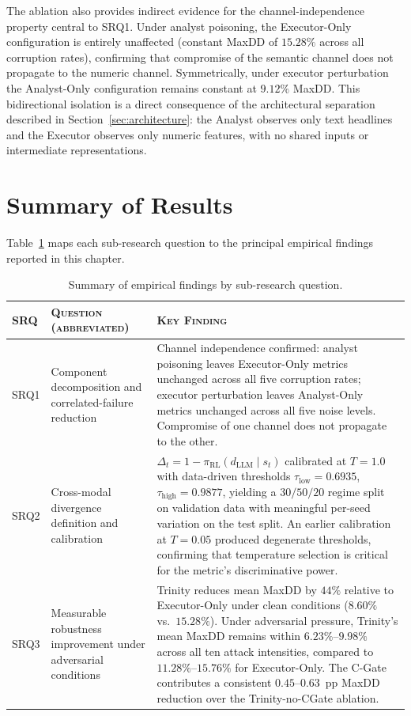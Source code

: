 The ablation also provides indirect evidence for the channel-independence
property central to SRQ1. Under analyst poisoning, the Executor-Only
configuration is entirely unaffected (constant MaxDD of $15.28\%$ across
all corruption rates), confirming that compromise of the semantic channel
does not propagate to the numeric channel. Symmetrically, under executor
perturbation the Analyst-Only configuration remains constant at $9.12\%$
MaxDD. This bidirectional isolation is a direct consequence of the
architectural separation described in Section~\ref{sec:architecture}: the
Analyst observes only text headlines and the Executor observes only
numeric features, with no shared inputs or intermediate representations.

\section{Summary of Results}
\label{sec:results-summary}

Table~\ref{tab:results-summary} maps each sub-research question to the
principal empirical findings reported in this chapter.

\begin{table}[h]
\centering
\caption{Summary of empirical findings by sub-research question.}
\label{tab:results-summary}
\begin{tabular}{p{1.2cm}p{5cm}p{6.5cm}}
\toprule
\textsc{SRQ} & \textsc{Question (abbreviated)} & \textsc{Key Finding} \\
\midrule
SRQ1 &
  Component decomposition and correlated-failure reduction &
  Channel independence confirmed: analyst poisoning leaves Executor-Only
  metrics unchanged across all five corruption rates; executor
  perturbation leaves Analyst-Only metrics unchanged across all five
  noise levels. Compromise of one channel does not propagate to the
  other. \\
\addlinespace
SRQ2 &
  Cross-modal divergence definition and calibration &
  $\Delta_t = 1 - \pi_{\text{RL}}(d_{\text{LLM}} \mid s_t)$ calibrated
  at $T = 1.0$ with data-driven thresholds $\tau_{\text{low}} = 0.6935$,
  $\tau_{\text{high}} = 0.9877$, yielding a $30/50/20$ regime split on
  validation data with meaningful per-seed variation on the test split. An
  earlier calibration at $T = 0.05$ produced degenerate thresholds,
  confirming that temperature selection is critical for the metric's
  discriminative power. \\
\addlinespace
SRQ3 &
  Measurable robustness improvement under adversarial conditions &
  Trinity reduces mean MaxDD by $44\%$ relative to Executor-Only under
  clean conditions ($8.60\%$ vs.\ $15.28\%$). Under adversarial
  pressure, Trinity's mean MaxDD remains within $6.23\%$--$9.98\%$
  across all ten attack intensities, compared to $11.28\%$--$15.76\%$
  for Executor-Only. The C-Gate contributes a consistent
  $0.45$--$0.63$~pp MaxDD reduction over the Trinity-no-CGate ablation.
  \\
\bottomrule
\end{tabular}
\end{table}


